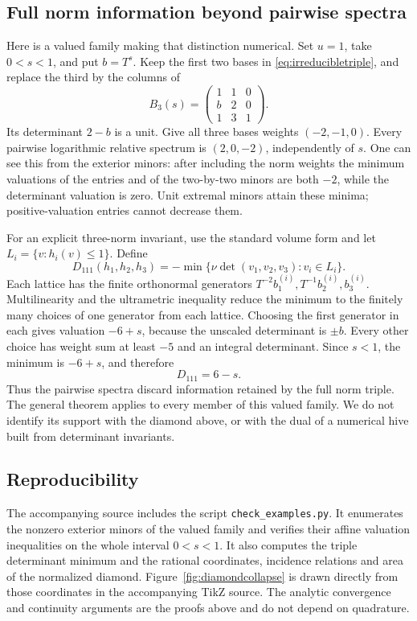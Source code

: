 \subsection{Full norm information beyond pairwise spectra}
Here is a valued family making that distinction numerical.
Set $u=1$, take $0<s<1$, and put $b=T^s$. Keep the first
two bases in \eqref{eq:irreducibletriple}, and replace the
third by the columns of
\[
 B_3(s)=\begin{pmatrix}1&1&0\\b&2&0\\1&3&1\end{pmatrix}.
\]
Its determinant $2-b$ is a unit. Give all three bases weights
$(-2,-1,0)$. Every pairwise logarithmic relative spectrum is
$(2,0,-2)$, independently of $s$. One can see this from the
exterior minors: after including the norm weights the minimum
valuations of the entries and of the two-by-two minors are
both $-2$, while the determinant valuation is zero. Unit
extremal minors attain these minima; positive-valuation
entries cannot decrease them.

For an explicit three-norm invariant, use the standard volume
form and let $L_i=\{v:h_i(v)\le1\}$. Define
\[
 D_{111}(h_1,h_2,h_3)
   =-\min\{\nu\det(v_1,v_2,v_3):v_i\in L_i\}.
\]
Each lattice has the finite orthonormal generators
$T^{-2}b^{(i)}_1,T^{-1}b^{(i)}_2,b^{(i)}_3$.
Multilinearity and the ultrametric inequality reduce the
minimum to the finitely many choices of one generator from
each lattice. Choosing the first generator in each gives
valuation $-6+s$, because the unscaled determinant is
$\pm b$. Every other choice has weight sum at least $-5$
and an integral determinant. Since $s<1$, the minimum is
$-6+s$, and therefore
\begin{equation}\label{eq:tripleinvariant}
 D_{111}=6-s.
\end{equation}
Thus the pairwise spectra discard information retained by
the full norm triple. The general theorem applies to every
member of this valued family. We do not identify its support
with the diamond above, or with the dual of a numerical hive
built from determinant invariants.


\subsection{Reproducibility}
The accompanying source includes the script
\texttt{check\_examples.py}. It enumerates the nonzero exterior minors of the valued family
and verifies their affine valuation inequalities on the whole
interval $0<s<1$. It also computes the triple determinant
minimum and the rational coordinates, incidence relations and
area of the normalized diamond. Figure~\ref{fig:diamondcollapse}
is drawn directly from those coordinates in the accompanying
TikZ source. The analytic convergence and continuity arguments
are the proofs above and do not depend on quadrature.
